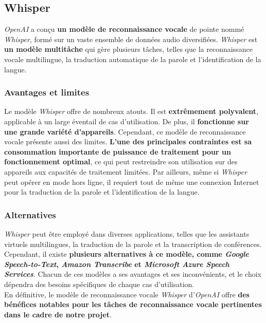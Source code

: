 \subsection{Whisper}
\label{subsec:Whisper}

\textit{OpenAI} a conçu \textbf{un modèle de reconnaissance vocale} de pointe nommé \textit{Whisper}, formé sur un vaste ensemble de données audio diversifiées.
\textit{Whisper} est \textbf{un modèle multitâche} qui gère plusieurs tâches, telles que la reconnaissance vocale multilingue,
la traduction automatique de la parole et l'identification de la langue.

\subsubsection*{Avantages et limites}
Le modèle \textit{Whisper} offre de nombreux atouts. Il est \textbf{extrêmement polyvalent}, applicable à un large éventail de cas d'utilisation.
De plus, il \textbf{fonctionne sur une grande variété d'appareils}. Cependant, ce modèle de reconnaissance vocale présente aussi des limites.
\textbf{L'une des principales contraintes est sa consommation importante de puissance de traitement pour un fonctionnement optimal},
ce qui peut restreindre son utilisation sur des appareils aux capacités de traitement limitées.
Par ailleurs, même si \textit{Whisper} peut opérer en mode hors ligne, il requiert tout de même une connexion Internet pour la traduction
de la parole et l'identification de la langue.

\subsubsection*{Alternatives}

\textit{Whisper} peut être employé dans diverses applications, telles que les assistants virtuels multilingues,
la traduction de la parole et la transcription de conférences. Cependant, il existe
\textbf{plusieurs alternatives à ce modèle, comme \textit{Google Speech-to-Text}, \textit{Amazon Transcribe} et \textit{Microsoft Azure Speech Services}}.
Chacun de ces modèles a ses avantages et ses inconvénients, et le choix dépendra des besoins spécifiques de chaque cas d'utilisation.\\

En définitive, le modèle de reconnaissance vocale \textit{Whisper} d'\textit{OpenAI} offre \textbf{des bénéfices notables pour les tâches de reconnaissance
    vocale pertinentes dans le cadre de notre projet}.

